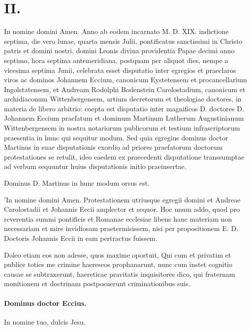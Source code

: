 \section*{II.}

In nomine domini Amen. Anno ab eodem incarnato M. D. XIX. indictione septima, die vero lunae, quarta mensis Julii, pontificatus sanctissimi in Christo patris et domini nostri, domini Leonis divina providentia Papae decimi anno septimo, hora septima antemeridiana, postquam per aliquot dies, nempe a vicesima septima Junii, celebrata esset disputatio inter egregios et praeclaros viros ac dominos Johannem Eccium, canonicum Eystetensem et procancellarium Ingolstatensem, et Andream Rodolphi Bodenstein Carolostadium, canonicum et archidiaconum Wittenbergensem, artium decretorum et theologiae doctores, in materia de libero arbitrio: coepta est disputatio inter magnificos D. doctores D. Johannem Eccium praefatum et dominum Martinum Lutherum Augustinianum Wittenbergensem in nostra notariorum publicorum et testium infrascriptorum praesentia in hunc qui sequitur modum. Sed quia egregius dominus doctor Martinus in suae disputationis exordio ad priores praefatorum doctorum protestationes se retulit, ideo eaedem ex praecedenti disputatione transsumptae ad verbum sequuntur huius disputationis initio praeinsertae.

Dominus D. Martinus in hunc modum orsus est.

'In nomine domini Amen. Protestationem utriusque egregii domini et Andreae Carolostadii et Johannis Eccii amplector et sequor. Hoc unum addo, quod pro reverentia summi pontificis et Romanae ecclesiae libens hanc materiam non necessariam et mire invidiosam praetermisissem, nisi per propositionem E. D. Doctoris Johannis Eccii in eam pertractus fuissem.

Doleo etiam eos non adesse, quos maxime oportuit, Qui cum et privatim et publice toties me crimine haereseos prophanarunt, nunc cum instet cognitio causae se subtraxerunt, haereticae pravitatis inquisitores dico, qui fraternam monitionem et doctrinam postposuerunt criminationibus suis.

\marginpar{\small[255]}
\paragraph*{Dominus doctor Eccius.}

In nomine tuo, dulcis Jesu.

